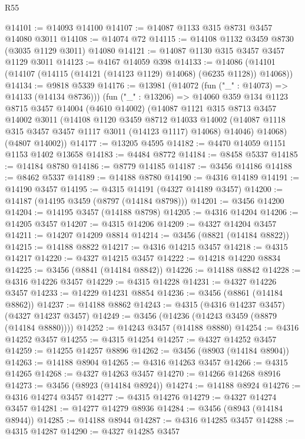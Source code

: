 \begin{lexlean}{R55}
\begin{coremodule}
@14101 := @14093 @14100
@14107 := @14087 @1133 @315 @8731 @3457 @14080 @3011
@14108 := @14074 @72
@14115 := @14108 @1132 @3459 @8730 (@3035 @1129 @3011) @14080
@14121 := @14087 @1130 @315 @3457 @3457 @1129 @3011
@14123 := @4167 @14059 @398
@14133 := @14086 (@14101 (@14107 (@14115 (@14121 (@14123 @1129) @14068) (@6235 @1128)) @14068))
@14134 := @9818 @5339
@14176 := @13981
    (@14072 (fun ("_" : @14073) => @14133 (@14134 @8736)))
    (fun ("_" : @13206) =>
    @14060
      @359
      @134
      @1123
      @8715
      @3457
      @14004
      (@4610 @14002)
      (@14087
        @1121
        @315
        @8713
        @3457
        @14002
        @3011
        (@14108
          @1120
          @3459
          @8712
          @14033
          @14002
          (@14087 @1118 @315 @3457 @3457 @1117 @3011 (@14123 @1117) @14068)
          @14046)
        @14068)
      (@4807 @14002))
@14177 := @13205 @4595
@14182 := @4470 @14059 @1151 @1153 @1402 @13658
@14183 := @4484 @8772
@14184 := @8458 @5337
@14185 := @14184 @8780
@14186 := @8779 @14185
@14187 := @3456 @14186
@14188 := @8462 @5337
@14189 := @14188 @8780
@14190 := @4316 @14189
@14191 := @14190 @3457
@14195 := @4315 @14191 (@4327 @14189 @3457)
@14200 := @14187 (@14195 @3459 (@8797 (@14184 @8798)))
@14201 := @3456 @14200
@14204 := @14195 @3457 (@14188 @8798)
@14205 := @4316 @14204
@14206 := @14205 @3457
@14207 := @4315 @14206
@14209 := @4327 @14204 @3457
@14211 := @14207 @14209 @8814
@14214 := @3456 (@8821 (@14184 @8822))
@14215 := @14188 @8822
@14217 := @4316 @14215 @3457
@14218 := @4315 @14217
@14220 := @4327 @14215 @3457
@14222 := @14218 @14220 @8834
@14225 := @3456 (@8841 (@14184 @8842))
@14226 := @14188 @8842
@14228 := @4316 @14226 @3457
@14229 := @4315 @14228
@14231 := @4327 @14226 @3457
@14233 := @14229 @14231 @8854
@14236 := @3456 (@8861 (@14184 @8862))
@14237 := @14188 @8862
@14243 := @4315 (@4316 @14237 @3457) (@4327 @14237 @3457)
@14249 := @3456 (@14236 (@14243 @3459 (@8879 (@14184 @8880))))
@14252 := @14243 @3457 (@14188 @8880)
@14254 := @4316 @14252 @3457
@14255 := @4315 @14254
@14257 := @4327 @14252 @3457
@14259 := @14255 @14257 @8896
@14262 := @3456 (@8903 (@14184 @8904))
@14263 := @14188 @8904
@14265 := @4316 @14263 @3457
@14266 := @4315 @14265
@14268 := @4327 @14263 @3457
@14270 := @14266 @14268 @8916
@14273 := @3456 (@8923 (@14184 @8924))
@14274 := @14188 @8924
@14276 := @4316 @14274 @3457
@14277 := @4315 @14276
@14279 := @4327 @14274 @3457
@14281 := @14277 @14279 @8936
@14284 := @3456 (@8943 (@14184 @8944))
@14285 := @14188 @8944
@14287 := @4316 @14285 @3457
@14288 := @4315 @14287
@14290 := @4327 @14285 @3457

\end{coremodule}
\end{lexlean}
